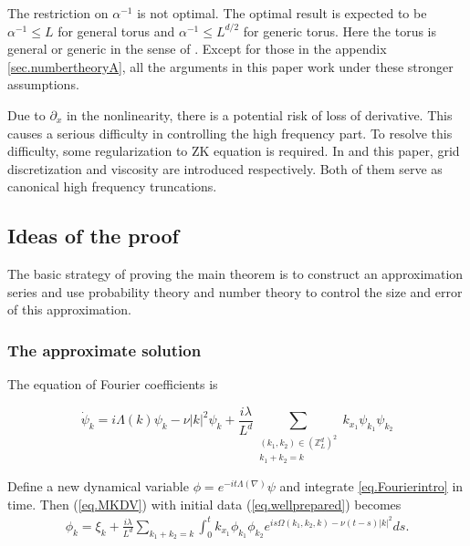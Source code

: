 \begin{rem}
The restriction on $\alpha^{-1}$ is not optimal. The optimal result is expected to be $\alpha^{-1}\le L$ for general torus and $\alpha^{-1}\le L^{d/2}$ for generic torus. Here the torus is general or generic in the sense of \cite{DH}. Except for those in the appendix \ref{sec.numbertheoryA}, all the arguments in this paper work under these stronger assumptions.
\end{rem}

\begin{rem}
Due to $\partial_x$ in the nonlinearity, there is a potential risk of loss of derivative. This causes a serious difficulty in controlling the high frequency part. To resolve this difficulty, some regularization to ZK equation is required. In \cite{ST} and this paper, grid discretization and viscosity are introduced respectively. Both of them serve as canonical high frequency truncations.
\end{rem}




 





\subsection{Ideas of the proof} The basic strategy of proving the main theorem is to construct an approximation series and use probability theory and number theory to control the size and error of this approximation.


\subsubsection{The approximate solution}\label{sec.appsol} The equation of Fourier coefficients is

\begin{equation}\label{eq.Fourierintro}
\dot{\psi}_{k} =  i\Lambda(k) \psi_k -\nu |k|^2 \psi_k
 +\frac{i\lambda}{L^{d}} \sum\limits_{\substack{(k_1,k_2) \in (\mathbb{Z}^d_L)^2 \\ k_1 + k_2 = k}} k_{x_1}\psi_{k_1} \psi_{k_2}
\end{equation}



Define a new dynamical variable $\phi= e^{-it\Lambda(\nabla)} \psi$ and integrate \eqref{eq.Fourierintro} in time. Then (\ref{eq.MKDV}) with initial data (\ref{eq.wellprepared}) becomes
\begin{equation}\label{eq.intmainintro}
\begin{split}
    \phi_k =\xi_k+\frac{i\lambda}{L^{d}} \sum\limits_{k_1 + k_2 = k}\int^{t}_0k_{x_1}\phi_{k_1} \phi_{k_2}e^{i s\Omega(k_1,k_2,k)-\nu(t-s)|k|^2} ds.  
\end{split}
\end{equation}

